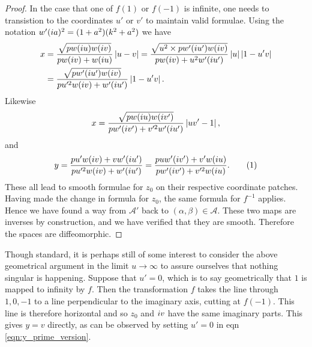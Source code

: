 \begin{lem}
\begin{proof}
In the case that one of $f(1)$ or $f(-1)$ is infinite, one needs to transistion to the coordinates $u'$ or $v'$ to maintain valid formulae. Using the notation $w'(i a)^2 = (1+a^2)(k^2 + a^2)$ we have
\begin{align*}
x
&= \frac{\sqrt{pw(i u)w(i v)}}{pw(i v) + w(i u)} \left|u-v\right|
= \frac{\sqrt{u^2 \times pw'(i u')w(i v)}}{pw(i v) + u^2 w'(i u')} \left|u\right|\left|1-u'v\right| \\
&= \frac{\sqrt{pw'(i u')w(i v)}}{pu'^2w(i v) + w'(i u')} \left|1-u'v\right|.
\end{align*}
Likewise
\[
x
= \frac{\sqrt{pw(i u)w(i v')}}{pw'(i v') + v'^2w'(i u')} \left|uv'-1\right|,
\]
and
\[
y
= \frac{pu'w(\iu v) + vw'(\iu u')}{pu'^2w(\iu v) + w'(\iu u')}
= \frac{puw'(\iu v') + v'w(\iu u)}{pw'(\iu v') + v'^2w(\iu u)}. \labelthis{eqn:y_prime_version}
\]
These all lead to smooth formulae for $z_0$ on their respective coordinate patches. Having made the change in formula for $z_0$, the same formula for $f^{-1}$ applies. Hence we have found a way from $\mathcal{A}'$ back to $(α,β) \in \mathcal{A}$. These two maps are inverses by construction, and we have verified that they are smooth. Therefore the spaces are diffeomorphic.
\end{proof}
\end{lem}

Though standard, it is perhaps still of some interest to consider the above geometrical argument in the limit $u\to\infty$ to assure ourselves that nothing singular is happening. Suppose that $u' = 0$, which is to say geometrically that $1$ is mapped to infinity by $f$. Then the transformation $f$ takes the line through $1,0,-1$ to a line perpendicular to the imaginary axis, cutting at $f(-1)$. This line is therefore horizontal and so $z_0$ and $i v$ have the same imaginary parts. This gives $y=v$ directly, as can be observed by setting $u'=0$ in eqn \eqref{eqn:y_prime_version}.

